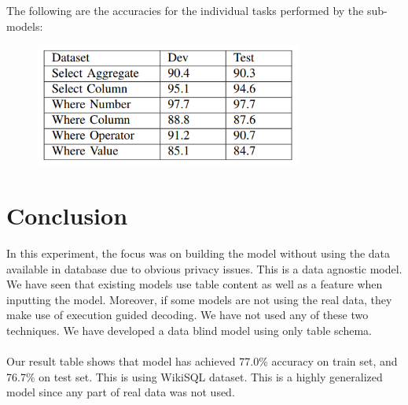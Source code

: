 \documentclass[12pt]{article}
\begin{document}
The following are the accuracies for the individual tasks
performed by the sub-models:

\begin{figure}[H]
    \includegraphics[width=250pt]{result2}
    \label{fig:Model Architecture}
\end{figure}

\section{Conclusion}
In this experiment, the focus was on building the model without using the data available in database due to obvious privacy issues. This is a data agnostic model. We have seen that existing models use table content as well as a feature when inputting the model. Moreover, if some models are not using the real data, they make use of execution guided decoding. We have not used any of these two techniques. We have developed a data blind model using only table schema. 
\\
\\
Our result table shows that model has achieved 77.0\% accuracy on train set, and 76.7\% on test set. This is using WikiSQL dataset. This is a highly generalized model since any part of real data was not used. 



\end{document}
